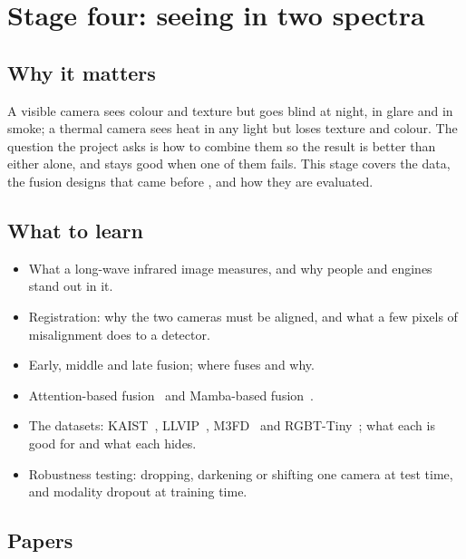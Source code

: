 \chapter{Stage four: seeing in two spectra}

\section{Why it matters}

A visible camera sees colour and texture but goes blind at night, in glare and in smoke; a thermal camera sees
heat in any light but loses texture and colour. The question the project asks is how to combine them so the
result is better than either alone, and stays good when one of them fails. This stage covers the data, the
fusion designs that came before \method{}, and how they are evaluated.

\section{What to learn}

\begin{itemize}
  \item What a long-wave infrared image measures, and why people and engines stand out in it.
  \item Registration: why the two cameras must be aligned, and what a few pixels of misalignment does to a detector.
  \item Early, middle and late fusion; where \method{} fuses and why.
  \item Attention-based fusion~\cite{qingyun2021cft,shen2024icafusion} and Mamba-based fusion~\cite{dong2025fusionmamba,li2025cfmw,como2024}.
  \item The datasets: KAIST~\cite{hwang2015kaist}, LLVIP~\cite{jia2021llvip}, M3FD~\cite{liu2022tardal} and RGBT-Tiny~\cite{ying2025rgbttiny};
        what each is good for and what each hides.
  \item Robustness testing: dropping, darkening or shifting one camera at test time, and modality dropout at training time.
\end{itemize}

\section{Papers}

